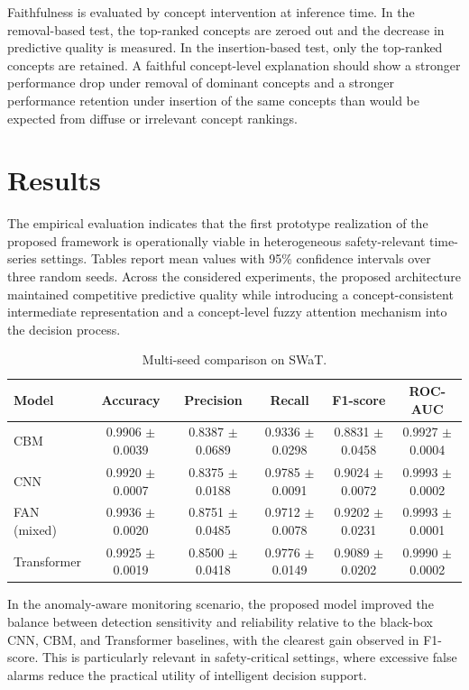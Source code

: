 \documentclass[runningheads]{llncs}
\begin{document}
Faithfulness is evaluated by concept intervention at inference time. In the removal-based test, the top-ranked concepts are zeroed out and the decrease in predictive quality is measured. In the insertion-based test, only the top-ranked concepts are retained. A faithful concept-level explanation should show a stronger performance drop under removal of dominant concepts and a stronger performance retention under insertion of the same concepts than would be expected from diffuse or irrelevant concept rankings.

\section{Results}

The empirical evaluation indicates that the first prototype realization of the proposed framework is operationally viable in heterogeneous safety-relevant time-series settings. Tables report mean values with 95\% confidence intervals over three random seeds. Across the considered experiments, the proposed architecture maintained competitive predictive quality while introducing a concept-consistent intermediate representation and a concept-level fuzzy attention mechanism into the decision process.

\begin{table}[tbp]
\caption{Multi-seed comparison on SWaT.}
\label{tab:swat_results}
\centering
{\scriptsize\setlength{\tabcolsep}{1.6pt}
\begin{tabular}{lccccc}
\toprule
Model & Accuracy & Precision & Recall & F1-score & ROC-AUC \\
\midrule
CBM & 0.9906 $\pm$ 0.0039 & 0.8387 $\pm$ 0.0689 & 0.9336 $\pm$ 0.0298 & 0.8831 $\pm$ 0.0458 & 0.9927 $\pm$ 0.0004 \\
CNN & 0.9920 $\pm$ 0.0007 & 0.8375 $\pm$ 0.0188 & 0.9785 $\pm$ 0.0091 & 0.9024 $\pm$ 0.0072 & 0.9993 $\pm$ 0.0002 \\
FAN (mixed) & 0.9936 $\pm$ 0.0020 & 0.8751 $\pm$ 0.0485 & 0.9712 $\pm$ 0.0078 & 0.9202 $\pm$ 0.0231 & 0.9993 $\pm$ 0.0001 \\
Transformer & 0.9925 $\pm$ 0.0019 & 0.8500 $\pm$ 0.0418 & 0.9776 $\pm$ 0.0149 & 0.9089 $\pm$ 0.0202 & 0.9990 $\pm$ 0.0002 \\
\bottomrule
\end{tabular}
}
\end{table}

In the anomaly-aware monitoring scenario, the proposed model improved the balance between detection sensitivity and reliability relative to the black-box CNN, CBM, and Transformer baselines, with the clearest gain observed in F1-score. This is particularly relevant in safety-critical settings, where excessive false alarms reduce the practical utility of intelligent decision support.
\end{document}
